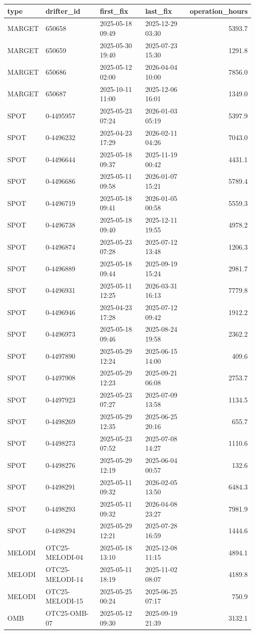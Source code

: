 \begin{tabular}{llllr}
\toprule
type & drifter_id & first_fix & last_fix & operation_hours \\
\midrule
MARGET & 650658 & 2025-05-18 09:49 & 2025-12-29 03:30 & 5393.7 \\
MARGET & 650659 & 2025-05-30 19:40 & 2025-07-23 15:30 & 1291.8 \\
MARGET & 650686 & 2025-05-12 02:00 & 2026-04-04 10:00 & 7856.0 \\
MARGET & 650687 & 2025-10-11 11:00 & 2025-12-06 16:01 & 1349.0 \\
SPOT & 0-4495957 & 2025-05-23 07:24 & 2026-01-03 05:19 & 5397.9 \\
SPOT & 0-4496232 & 2025-04-23 17:29 & 2026-02-11 04:26 & 7043.0 \\
SPOT & 0-4496644 & 2025-05-18 09:37 & 2025-11-19 00:42 & 4431.1 \\
SPOT & 0-4496686 & 2025-05-11 09:58 & 2026-01-07 15:21 & 5789.4 \\
SPOT & 0-4496719 & 2025-05-18 09:41 & 2026-01-05 00:58 & 5559.3 \\
SPOT & 0-4496738 & 2025-05-18 09:40 & 2025-12-11 19:55 & 4978.2 \\
SPOT & 0-4496874 & 2025-05-23 07:28 & 2025-07-12 13:48 & 1206.3 \\
SPOT & 0-4496889 & 2025-05-18 09:44 & 2025-09-19 15:24 & 2981.7 \\
SPOT & 0-4496931 & 2025-05-11 12:25 & 2026-03-31 16:13 & 7779.8 \\
SPOT & 0-4496946 & 2025-04-23 17:28 & 2025-07-12 09:42 & 1912.2 \\
SPOT & 0-4496973 & 2025-05-18 09:46 & 2025-08-24 19:58 & 2362.2 \\
SPOT & 0-4497890 & 2025-05-29 12:24 & 2025-06-15 14:00 & 409.6 \\
SPOT & 0-4497908 & 2025-05-29 12:23 & 2025-09-21 06:08 & 2753.7 \\
SPOT & 0-4497923 & 2025-05-23 07:27 & 2025-07-09 13:58 & 1134.5 \\
SPOT & 0-4498269 & 2025-05-29 12:35 & 2025-06-25 20:16 & 655.7 \\
SPOT & 0-4498273 & 2025-05-23 07:52 & 2025-07-08 14:27 & 1110.6 \\
SPOT & 0-4498276 & 2025-05-29 12:19 & 2025-06-04 00:57 & 132.6 \\
SPOT & 0-4498291 & 2025-05-11 09:32 & 2026-02-05 13:50 & 6484.3 \\
SPOT & 0-4498293 & 2025-05-11 09:32 & 2026-04-08 23:27 & 7981.9 \\
SPOT & 0-4498294 & 2025-05-29 12:21 & 2025-07-28 16:59 & 1444.6 \\
MELODI & OTC25-MELODI-04 & 2025-05-18 13:10 & 2025-12-08 11:15 & 4894.1 \\
MELODI & OTC25-MELODI-14 & 2025-05-11 18:19 & 2025-11-02 08:07 & 4189.8 \\
MELODI & OTC25-MELODI-15 & 2025-05-25 00:24 & 2025-06-25 07:17 & 750.9 \\
OMB & OTC25-OMB-07 & 2025-05-12 09:30 & 2025-09-19 21:39 & 3132.1 \\
\bottomrule
\end{tabular}
